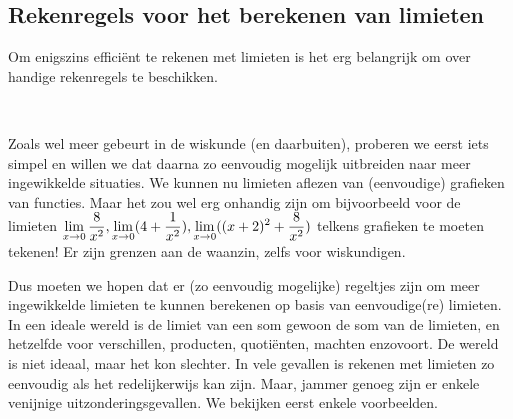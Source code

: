 \documentclass[numbers]{ximera}
\begin{document}
\begin{comment}
	\begin{enumerate}
		\item $\limx    \frac{1}{x^2}=\;$\let\i\localoefoptions
		\item $\limxi   e^x = \;$        \localoefoptions
		\item $\limxmi  e^x = \;$        \localoefoptions
		\item $\rlimx   e^{\frac 1x} = $
		\item $\llimx   e^{\frac 1x} = $
		\item $\limxi   \ln x = $
		\item $\rlimx   \ln x = $
		\item $\limxmi  \ln x = $
		\item $\limxi   \ln(1+ \frac 1x) = $
	\end{enumerate}
\end{exercise}
\end{comment}

\subsection{Rekenregels voor het berekenen van limieten}

Om enigszins efficiënt te rekenen  met limieten is het erg belangrijk om over handige rekenregels te beschikken.

\begin{uitwijding} \ 
	
Zoals wel meer gebeurt in de wiskunde (en daarbuiten), proberen we eerst iets simpel en willen we dat daarna zo eenvoudig mogelijk uitbreiden naar meer ingewikkelde situaties. We kunnen nu limieten aflezen van (eenvoudige) grafieken van functies. Maar het zou wel erg onhandig zijn om bijvoorbeeld voor de limieten $\limx \frac{8}{x^2}, \limx (4+\frac{1}{x^2}), \limx ((x+2)^2 + \frac{8}{x^2})$ telkens grafieken te moeten tekenen! Er zijn grenzen aan de waanzin, zelfs voor wiskundigen.

Dus moeten we hopen dat er (zo eenvoudig mogelijke) regeltjes zijn om meer ingewikkelde limieten te kunnen berekenen op basis van eenvoudige(re) limieten. In een ideale wereld is de limiet van een som gewoon de som van de limieten, en hetzelfde voor verschillen, producten, quotiënten, machten enzovoort. De wereld is niet ideaal, maar het kon slechter. In vele gevallen is rekenen met limieten  zo eenvoudig als het redelijkerwijs kan zijn. Maar, jammer genoeg zijn er enkele venijnige uitzonderingsgevallen. We bekijken eerst enkele voorbeelden.
\end{uitwijding}
\end{document}
